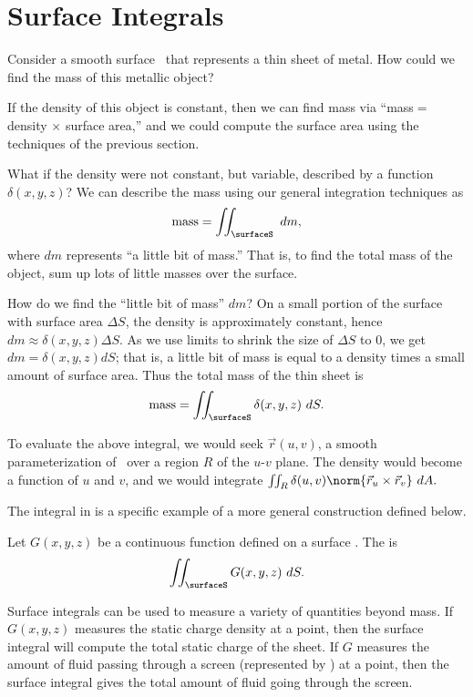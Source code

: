 \section{Surface Integrals}\label{sec:surface_integral}

Consider a smooth surface \surfaceS\ that represents a thin sheet of metal. How could we find the mass of this metallic object?

If the density of this object is constant, then we can find mass via ``mass$=$ density $\times$ surface area,'' and we could compute the surface area using the techniques of the previous section. 

What if the density were not constant, but variable, described by a function $\delta(x,y,z)$? We can describe the mass using our general integration techniques as
\[\text{mass} = \iint_\surfaceS \ dm,\]
where $dm$ represents ``a little bit of mass.'' That is, to find the total mass of the object, sum up lots of little masses over the surface.

How do we find the ``little bit of mass'' $dm$? On a small portion of the surface with surface area $\Delta S$, the density is approximately constant, hence $dm \approx \delta(x,y,z)\Delta S$. As we use limits to shrink the size of $\Delta S$ to 0, we get $dm = \delta(x,y,z)dS$; that is, a little bit of mass is equal to a density times a small amount of surface area. Thus the total mass of the thin sheet is
\begin{equation}
\text{mass} =\iint_\surfaceS \delta(x,y,z)\ dS.\label{eq:surface_int}
\end{equation}

To evaluate the above integral, we would seek $\vec r(u,v)$, a smooth parameterization of \surfaceS\ over a region $R$ of the $u$-$v$ plane. The density would become a function of $u$ and $v$, and we would integrate $\iint_R \delta(u,v)\norm{\vec r_u\times \vec r_v}\ dA.$

The integral in  is a specific example of a more general construction defined below.

\begin{definition}\label{def:surface_integral}
Let $G(x,y,z)$ be a continuous function defined on a surface \surfaceS. The  is
\[\iint_\surfaceS G(x,y,z)\ dS.\]
\end{definition}

Surface integrals can be used to measure a variety of quantities beyond mass. If $G(x,y,z)$ measures the static charge density at a point, then the surface integral will compute the total static charge of the sheet. If $G$ measures the amount of fluid passing through a screen (represented by \surfaceS) at a point, then the surface integral gives the total amount of fluid going through the screen.

